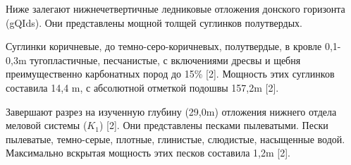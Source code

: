 Ниже залегают нижнечетвертичные ледниковые отложения донского горизонта (gQIds). Они представлены мощной толщей суглинков полутвердых.

Суглинки коричневые, до темно-серо-коричневых, полутвердые, в кровле 0,1-0,3\si{\meter} тугопластичные, песчанистые, с включениями дресвы и щебня преимущественно карбонатных пород до 15\% [2]. Мощность этих суглинков составила 14,4 \si{\meter}, с абсолютной отметкой подошвы 157,2\si{\meter} [2].

Завершают разрез на изученную глубину (29,0\si{\meter}) отложения нижнего отдела меловой системы ($K_1$) [2]. Они представлены песками пылеватыми. Пески пылеватые, темно-серые, плотные, глинистые, слюдистые, насыщенные водой. Максимально вскрытая мощность этих песков составила 1,2\si{\meter} [2].
